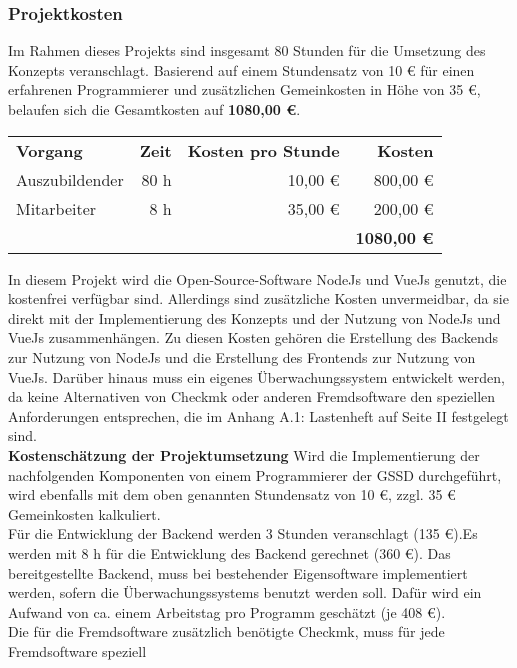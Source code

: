 \begin{flushleft}
\subsubsection{Projektkosten}
Im Rahmen dieses Projekts sind insgesamt 80 Stunden für die Umsetzung des Konzepts veranschlagt. Basierend auf einem Stundensatz von 10 € für einen erfahrenen Programmierer und zusätzlichen Gemeinkosten in Höhe von 35 €, belaufen sich die Gesamtkosten auf \textbf{1080,00 €}.
\begin{center}
	\begin{tabular}{ l r r r }
	\rowcolor{babyblue}
	\textbf{Vorgang} & \textbf{Zeit} & \textbf{Kosten pro Stunde} & \textbf{Kosten} \\
	Auszubildender & 80 h & 10,00 € & 800,00 €  \\
	\rowcolor{Gray}
	Mitarbeiter & 8 h & 35,00 € & 200,00 €  \\ \hline
	\rowcolor{babyblue}
	 & & & \textbf{1080,00 €}  \\
	\end{tabular}
\end{center}
In diesem Projekt wird die Open-Source-Software NodeJs und VueJs genutzt, die kostenfrei verfügbar sind. Allerdings sind zusätzliche Kosten unvermeidbar, da sie direkt mit der Implementierung des Konzepts und der Nutzung von NodeJs und VueJs zusammenhängen. Zu diesen Kosten gehören die Erstellung des Backends zur Nutzung von NodeJs und die Erstellung des Frontends zur Nutzung von VueJs. Darüber hinaus muss ein eigenes Überwachungssystem entwickelt werden, da keine Alternativen von Checkmk oder anderen Fremdsoftware den speziellen Anforderungen entsprechen, die im Anhang A.1: Lastenheft auf Seite II festgelegt sind.\\
\textbf{Kostenschätzung der Projektumsetzung} Wird die Implementierung der nachfolgenden Komponenten
von einem Programmierer der GSSD durchgeführt, wird ebenfalls mit dem oben genannten Stundensatz
von 10 €, zzgl. 35 € Gemeinkosten kalkuliert.\\
Für die Entwicklung der Backend werden 3 Stunden veranschlagt (135 €).Es werden mit 8 h für die
Entwicklung des Backend gerechnet (360 €). Das bereitgestellte Backend, muss bei
bestehender Eigensoftware implementiert werden, sofern die Überwachungssystems benutzt werden soll. Dafür wird ein
Aufwand von ca. einem Arbeitstag pro Programm geschätzt (je 408 €).\\
Die für die Fremdsoftware zusätzlich benötigte Checkmk, muss für jede Fremdsoftware speziell

\end{flushleft}

